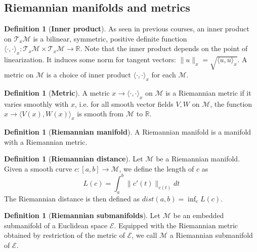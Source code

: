 \documentclass[12pt, openany]{report}
\newcommand{\R}{\mathbb{R}}
\newcommand{\M}{\mathcal{M}}
\theoremstyle{definition}
\newtheorem{definition}[thm]{Definition}
\begin{document}
\subsection{Riemannian manifolds and metrics}
\begin{definition}[\textbf{Inner product}]
	As seen in previous courses, an inner product on $\mathcal{T}_x\M$ is a bilinear, symmetric, positive definite function $\langle \cdot, \cdot \rangle_x :\mathcal{T}_x\M \times \mathcal{T}_x\M\to \R$. Note that the inner product depends on the point of linearization. It induces some norm for tangent vectors: $\| u\|_x = \sqrt{\langle u,u\rangle_x}$. A metric on $\M$ is a choice of inner product $\langle \cdot,\cdot \rangle_x$ for each $\M$.
\end{definition}
\begin{definition}[\textbf{Metric}]
	A metric $x\to \langle \cdot,\cdot\rangle_x$ on $\M$ is a Riemannian metric if it varies smoothly with $x$, i.e. for all smooth vector fields $V,W$ on $\M$, the function $x\to \langle V(x), W(x)\rangle_x$ is smooth from $\M$ to $\R$. 
\end{definition}
\begin{definition}[\textbf{Riemannian manifold}]
	A Riemannian manifold is a manifold with a Riemannian metric. 
\end{definition}
\begin{definition}[\textbf{Riemannian distance}]
	Let $\M$ be a Riemannian manifold. Given a smooth curve $c:[a,b]\to \M$, we define the length of $c$ as 
	\begin{equation}
		L(c) = \int_a^b \| c'(t)\|_{c(t)}dt
	\end{equation}
	The Riemannian distance is then defined as $dist(a,b) = \inf_c L(c)$. 
\end{definition}
\begin{definition}[\textbf{Riemannian submanifolds}]
	Let $\M$ be an embedded submanifold of a Euclidean space $\mathcal{E}$. Equipped with the Riemannian metric obtained by restriction of the metric of $\mathcal{E}$, we call $\M$ a Riemannian submanifold of $\mathcal{E}$. 
\end{definition}
\end{document}
